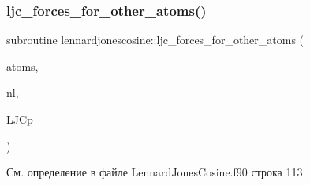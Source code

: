 \subsubsection{\texorpdfstring{ljc\+\_\+forces\+\_\+for\+\_\+other\+\_\+atoms()}{ljc\_forces\_for\_other\_atoms()}}
{\footnotesize\ttfamily subroutine lennardjonescosine\+::ljc\+\_\+forces\+\_\+for\+\_\+other\+\_\+atoms (\begin{DoxyParamCaption}\item[{type(\mbox{\hyperlink{structmd__general_1_1particles}{particles}})}]{atoms,  }\item[{type(\mbox{\hyperlink{structmd__general_1_1neighbour__list}{neighbour\+\_\+list}})}]{nl,  }\item[{type(\mbox{\hyperlink{structlennardjonescosine_1_1lennardjonescosine__parameters}{lennardjonescosine\+\_\+parameters}})}]{L\+J\+Cp }\end{DoxyParamCaption})}



См. определение в файле Lennard\+Jones\+Cosine.\+f90 строка 113



